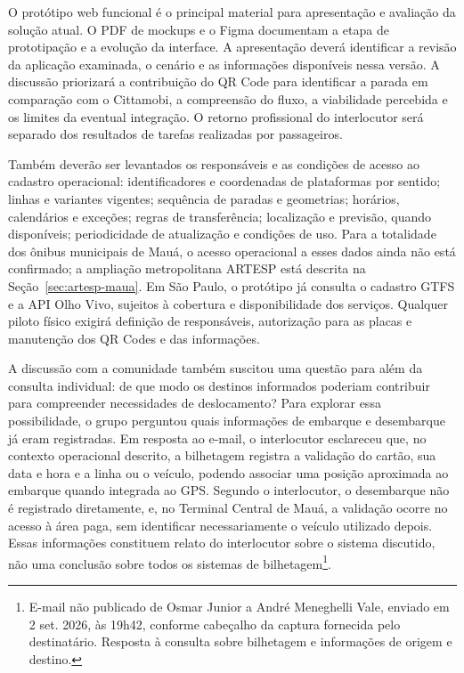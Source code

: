 O protótipo web funcional é o principal material para apresentação e avaliação da solução atual. O PDF de mockups e o Figma documentam a etapa de prototipação e a evolução da interface. A apresentação deverá identificar a revisão da aplicação examinada, o cenário e as informações disponíveis nessa versão. A discussão priorizará a contribuição do QR Code para identificar a parada em comparação com o Cittamobi, a compreensão do fluxo, a viabilidade percebida e os limites da eventual integração. O retorno profissional do interlocutor será separado dos resultados de tarefas realizadas por passageiros.

Também deverão ser levantados os responsáveis e as condições de acesso ao cadastro operacional: identificadores e coordenadas de plataformas por sentido; linhas e variantes vigentes; sequência de paradas e geometrias; horários, calendários e exceções; regras de transferência; localização e previsão, quando disponíveis; periodicidade de atualização e condições de uso. Para a totalidade dos ônibus municipais de Mauá, o acesso operacional a esses dados ainda não está confirmado; a ampliação metropolitana ARTESP está descrita na Seção~\ref{sec:artesp-maua}. Em São Paulo, o protótipo já consulta o cadastro GTFS e a API Olho Vivo, sujeitos à cobertura e disponibilidade dos serviços. Qualquer piloto físico exigirá definição de responsáveis, autorização para as placas e manutenção dos QR Codes e das informações.

A discussão com a comunidade também suscitou uma questão para além da consulta individual: de que modo os destinos informados poderiam contribuir para compreender necessidades de deslocamento? Para explorar essa possibilidade, o grupo perguntou quais informações de embarque e desembarque já eram registradas. Em resposta ao e-mail, o interlocutor esclareceu que, no contexto operacional descrito, a bilhetagem registra a validação do cartão, sua data e hora e a linha ou o veículo, podendo associar uma posição aproximada ao embarque quando integrada ao GPS. Segundo o interlocutor, o desembarque não é registrado diretamente, e, no Terminal Central de Mauá, a validação ocorre no acesso à área paga, sem identificar necessariamente o veículo utilizado depois. Essas informações constituem relato do interlocutor sobre o sistema discutido, não uma conclusão sobre todos os sistemas de bilhetagem\footnote{E-mail não publicado de Osmar Junior a André Meneghelli Vale, enviado em 2 set. 2026, às 19h42, conforme cabeçalho da captura fornecida pelo destinatário. Resposta à consulta sobre bilhetagem e informações de origem e destino.}.

